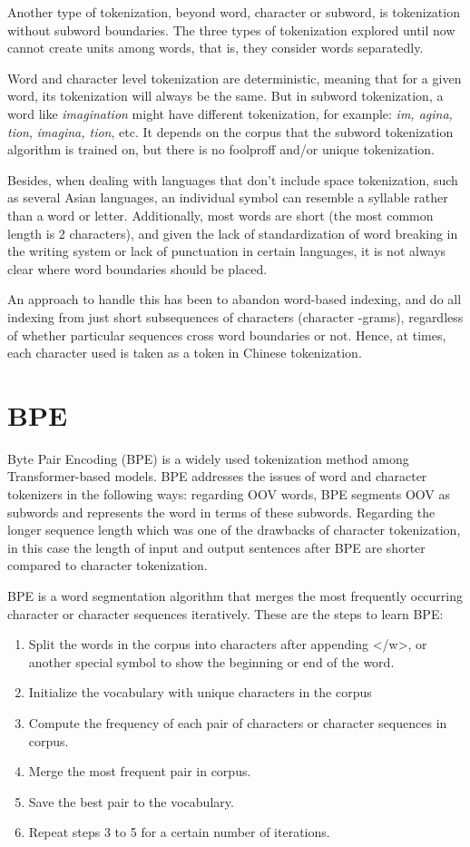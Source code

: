 Another type of tokenization, beyond word, character or subword, is tokenization without subword boundaries. The three types of tokenization explored until now cannot create units among words, that is, they consider words separatedly.

Word and character level tokenization are deterministic, meaning that for a given word, its tokenization will always be the same. But in subword tokenization, a word like \emph{imagination} might have different tokenization, for example: \emph{im, agina, tion}, \emph{imagina, tion}, etc. It depends on the corpus that the subword tokenization algorithm is trained on, but there is no foolproff and/or unique tokenization.

Besides, when dealing with languages that don't include space tokenization, such as several Asian languages, an individual symbol can resemble a syllable rather than a word or letter. Additionally, most words are short (the most common length is 2 characters), and given the lack of standardization of word breaking in the writing system or lack of punctuation in certain languages, it is not always clear where word boundaries should be placed.

An approach to handle this has been to abandon word-based indexing, and do all indexing from just short subsequences of characters (character -grams), regardless of whether particular sequences cross word boundaries or not. Hence, at times, each character used is taken as a token in Chinese tokenization.

\section{BPE}

Byte Pair Encoding (BPE) is a widely used tokenization method among Transformer-based models. BPE addresses the issues of word and character tokenizers in the following ways: regarding OOV words, BPE segments OOV as subwords and represents the word in terms of these subwords. Regarding the longer sequence length which was one of the drawbacks of character tokenization, in this case the length of input and output sentences after BPE are shorter compared to character tokenization.

BPE is a word segmentation algorithm that merges the most frequently occurring character or character sequences iteratively. These are the steps to learn BPE:

\begin{enumerate}
    \item Split the words in the corpus into characters after appending </w>, or another special symbol to show the beginning or end of the word.
    \item Initialize the vocabulary with unique characters in the corpus
    \item Compute the frequency of each pair of characters or character sequences in corpus.
    \item Merge the most frequent pair in corpus.
    \item Save the best pair to the vocabulary.
    \item Repeat steps 3 to 5 for a certain number of iterations.
\end{enumerate}

